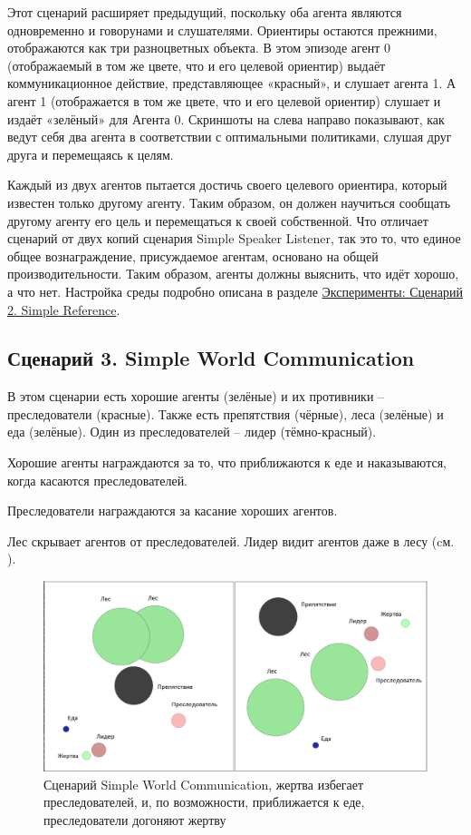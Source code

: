 Этот сценарий расширяет предыдущий, поскольку оба агента являются одновременно и говорунами и слушателями. Ориентиры остаются прежними, отображаются как три разноцветных объекта. В этом эпизоде агент 0 (отображаемый в том же цвете, что и его целевой ориентир) выдаёт коммуникационное действие, представляющее «красный», и слушает агента 1. А агент 1 (отображается в том же цвете, что и его целевой ориентир) слушает и издаёт «зелёный» для Агента 0. Скриншоты на  слева направо показывают, как ведут себя два агента в соответствии с оптимальными политиками, слушая друг друга и перемещаясь к целям.

Каждый из двух агентов пытается достичь своего целевого ориентира, который известен только другому агенту. Таким образом, он должен научиться сообщать другому агенту его цель и перемещаться к своей собственной. Что отличает сценарий от двух копий сценария Simple Speaker Listener, так это то, что единое общее вознаграждение, присуждаемое агентам, основано на общей производительности. Таким образом, агенты должны выяснить, что идёт хорошо, а что нет. Настройка среды подробно описана в разделе \hyperref[exp-sr]{Эксперименты: Сценарий 2. Simple Reference}.

\subsection{Сценарий 3. Simple World Communication} \label{intro-swc}

В этом сценарии есть хорошие агенты (зелёные) и их противники – преследователи (красные). Также есть препятствия (чёрные), леса (зелёные) и еда (зелёные). Один из преследователей – лидер (тёмно-красный).

Хорошие агенты награждаются за то, что приближаются к еде и наказываются, когда касаются преследователей.

Преследователи награждаются за касание хороших агентов.

Лес скрывает агентов от преследователей. Лидер видит агентов даже в лесу (cм. ).

\begin{figure}[ht!]
    \center
    \includegraphics [scale=0.41] {my_folder/images/intro/swc.png}
    \caption{Сценарий Simple World Communication, жертва избегает преследователей, и, по возможности, приближается к еде, преследователи догоняют жертву}
    \label{fig:swc}
\end{figure}

